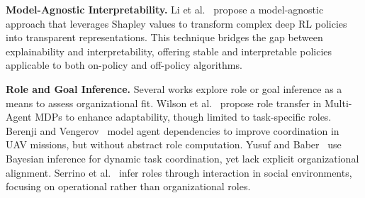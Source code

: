 \documentclass[pdflatex,sn-mathphys-num]{sn-jnl}%
\theoremstyle{thmstyleone}%
\theoremstyle{thmstyletwo}%
\theoremstyle{thmstylethree}%
\begin{document}
\textbf{Model-Agnostic Interpretability.} Li et al.~\cite{li2025from} propose a model-agnostic approach that leverages Shapley values to transform complex deep RL policies into transparent representations. This technique bridges the gap between explainability and interpretability, offering stable and interpretable policies applicable to both on-policy and off-policy algorithms.

\textbf{Role and Goal Inference.} Several works explore role or goal inference as a means to assess organizational fit. Wilson et al.~\cite{Williams2004} propose role transfer in Multi-Agent MDPs to enhance adaptability, though limited to task-specific roles. Berenji and Vengerov~\cite{Zhang2013} model agent dependencies to improve coordination in UAV missions, but without abstract role computation. Yusuf and Baber~\cite{yusuf2020inferential} use Bayesian inference for dynamic task coordination, yet lack explicit organizational alignment. Serrino et al.~\cite{serrino2019finding} infer roles through interaction in social environments, focusing on operational rather than organizational roles.






\end{document}
